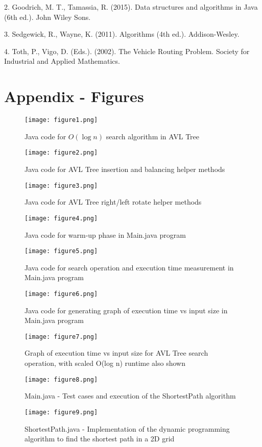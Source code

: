 \documentclass[12pt]{article}
\begin{document}
2. Goodrich, M. T., Tamassia, R. (2015). Data structures and algorithms in Java (6th ed.). John Wiley Sons.

3. Sedgewick, R., Wayne, K. (2011). Algorithms (4th ed.). Addison-Wesley.

4. Toth, P., Vigo, D. (Eds.). (2002). The Vehicle Routing Problem. Society for Industrial and Applied Mathematics.

\clearpage

\section*{Appendix - Figures}

\begin{figure}[h]
\centering
\texttt{[image: figure1.png]}
\caption{Java code for $O(\log n)$ search algorithm in AVL Tree}
\end{figure}

\begin{figure}[h]
\centering
\texttt{[image: figure2.png]}
\caption{Java code for AVL Tree insertion and balancing helper methods}
\end{figure}

\begin{figure}[h]
\centering
\texttt{[image: figure3.png]}
\caption{Java code for AVL Tree right/left rotate helper methods}
\end{figure}

\begin{figure}[h]
\centering
\texttt{[image: figure4.png]}
\caption{Java code for warm-up phase in Main.java program}
\end{figure}

\begin{figure}[h]
\centering
\texttt{[image: figure5.png]}
\caption{Java code for search operation and execution time measurement in Main.java program}
\end{figure}

\begin{figure}[h]
\centering
\texttt{[image: figure6.png]}
\caption{Java code for generating graph of execution time vs input size in Main.java program}
\end{figure}

\begin{figure}[h]
\centering
\texttt{[image: figure7.png]}
\caption{Graph of execution time vs input size for AVL Tree search operation, with scaled O(log n) runtime also shown}
\end{figure}

\begin{figure}[h]
\centering
\texttt{[image: figure8.png]}
\caption{Main.java - Test cases and execution of the ShortestPath algorithm}
\end{figure}

\begin{figure}[h]
\centering
\texttt{[image: figure9.png]}
\caption{ShortestPath.java - Implementation of the dynamic programming algorithm to find the shortest path in a 2D grid}
\end{figure}
\end{document}
